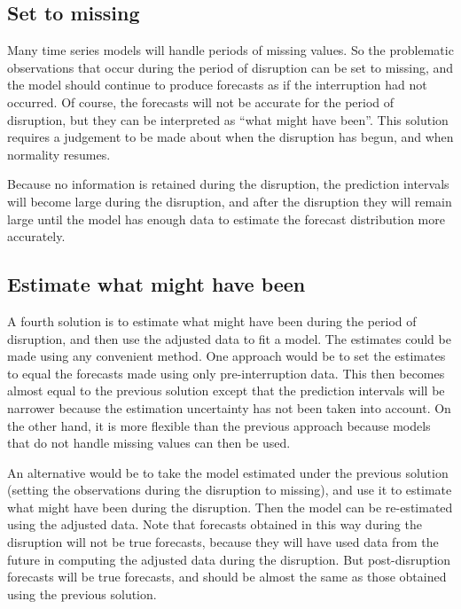 \documentclass[11pt,a4paper,]{article}
\begin{document}
\subsection{Set to missing}\label{set-to-missing}

Many time series models will handle periods of missing values. So the
problematic observations that occur during the period of disruption can
be set to missing, and the model should continue to produce forecasts as
if the interruption had not occurred. Of course, the forecasts will not
be accurate for the period of disruption, but they can be interpreted as
``what might have been''. This solution requires a judgement to be made
about when the disruption has begun, and when normality resumes.

Because no information is retained during the disruption, the prediction
intervals will become large during the disruption, and after the
disruption they will remain large until the model has enough data to
estimate the forecast distribution more accurately.

\subsection{Estimate what might have
been}\label{estimate-what-might-have-been}

A fourth solution is to estimate what might have been during the period
of disruption, and then use the adjusted data to fit a model. The
estimates could be made using any convenient method. One approach would
be to set the estimates to equal the forecasts made using only
pre-interruption data. This then becomes almost equal to the previous
solution except that the prediction intervals will be narrower because
the estimation uncertainty has not been taken into account. On the other
hand, it is more flexible than the previous approach because models that
do not handle missing values can then be used.

An alternative would be to take the model estimated under the previous
solution (setting the observations during the disruption to missing),
and use it to estimate what might have been during the disruption. Then
the model can be re-estimated using the adjusted data. Note that
forecasts obtained in this way during the disruption will not be true
forecasts, because they will have used data from the future in computing
the adjusted data during the disruption. But post-disruption forecasts
will be true forecasts, and should be almost the same as those obtained
using the previous solution.
\end{document}
